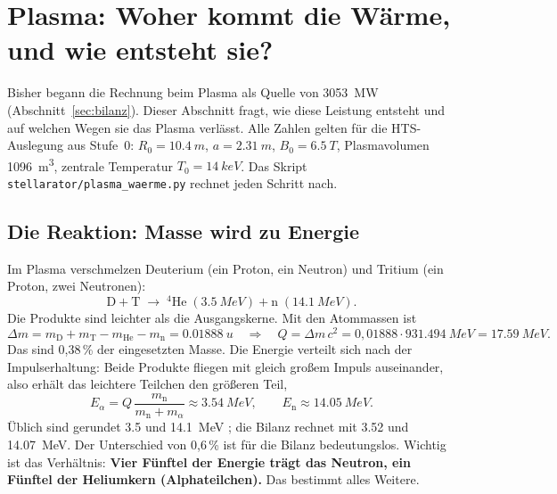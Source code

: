 \section{Plasma: Woher kommt die Wärme, und wie entsteht sie?}\label{sec:plasma}

Bisher begann die Rechnung beim Plasma als Quelle von \SI{3053}{MW} (Abschnitt~\ref{sec:bilanz}). Dieser Abschnitt
fragt, wie diese Leistung entsteht und auf welchen Wegen sie das Plasma verlässt. Alle Zahlen gelten für die
HTS-Auslegung aus Stufe~0: $R_0 = \SI{10,4}{m}$, $a = \SI{2,31}{m}$, $B_0 = \SI{6,5}{T}$, Plasmavolumen
\SI{1096}{m^3}, zentrale Temperatur $T_0 = \SI{14}{keV}$. Das Skript \texttt{stellarator/plasma\_waerme.py} rechnet
jeden Schritt nach.

\subsection{Die Reaktion: Masse wird zu Energie}
Im Plasma verschmelzen Deuterium (ein Proton, ein Neutron) und Tritium (ein Proton, zwei Neutronen):
\[ \mathrm{D} + \mathrm{T} \;\rightarrow\; {}^4\mathrm{He}\;(\SI{3,5}{MeV}) + \mathrm{n}\;(\SI{14,1}{MeV}). \]
Die Produkte sind leichter als die Ausgangskerne. Mit den Atommassen \cite{ame2020} ist
\[ \Delta m = m_\mathrm{D} + m_\mathrm{T} - m_\mathrm{He} - m_\mathrm{n} = \SI{0,01888}{u}
   \quad\Rightarrow\quad Q = \Delta m\,c^2 = 0{,}01888 \cdot \SI{931,494}{MeV} = \SI{17,59}{MeV}. \]
Das sind 0,38\,\% der eingesetzten Masse. Die Energie verteilt sich nach der Impulserhaltung: Beide Produkte fliegen
mit gleich großem Impuls auseinander, also erhält das leichtere Teilchen den größeren Teil,
\[ E_\alpha = Q\,\frac{m_\mathrm{n}}{m_\mathrm{n} + m_\alpha} \approx \SI{3,54}{MeV},\qquad E_\mathrm{n} \approx \SI{14,05}{MeV}. \]
Üblich sind gerundet \SI{3,5}{} und \SI{14,1}{MeV} \cite{wiki_tritium}; die Bilanz rechnet mit \SI{3,52}{} und
\SI{14,07}{MeV}. Der Unterschied von 0,6\,\% ist für die Bilanz bedeutungslos. Wichtig ist das Verhältnis: \textbf{Vier
Fünftel der Energie trägt das Neutron, ein Fünftel der Heliumkern (Alphateilchen).} Das bestimmt alles Weitere.

